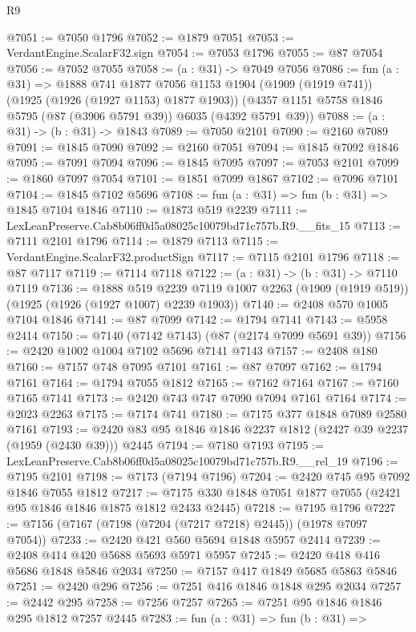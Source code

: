\begin{lexlean}{R9}
\begin{coremodule}
@7051 := @7050 @1796
@7052 := @1879 @7051
@7053 := VerdantEngine.ScalarF32.sign
@7054 := @7053 @1796
@7055 := @87 @7054
@7056 := @7052 @7055
@7058 := (a : @31) -> @7049 @7056
@7086 := fun (a : @31) =>
  @1888
    @741
    @1877
    @7056
    @1153
    @1904
    (@1909 (@1919 @741))
    (@1925 (@1926 (@1927 @1153) @1877 @1903))
    (@4357 @1151 @5758 @1846 @5795 (@87 (@3906 @5791 @39)) @6035 (@4392 @5791 @39))
@7088 := (a : @31) -> (b : @31) -> @1843
@7089 := @7050 @2101
@7090 := @2160 @7089
@7091 := @1845 @7090
@7092 := @2160 @7051
@7094 := @1845 @7092 @1846
@7095 := @7091 @7094
@7096 := @1845 @7095
@7097 := @7053 @2101
@7099 := @1860 @7097 @7054
@7101 := @1851 @7099 @1867
@7102 := @7096 @7101
@7104 := @1845 @7102 @5696
@7108 := fun (a : @31) => fun (b : @31) => @1845 @7104 @1846
@7110 := @1873 @519 @2239
@7111 := LexLeanPreserve.Cab8b06ff0d5a08025c10079bd71c757b.R9.__fits_15
@7113 := @7111 @2101 @1796
@7114 := @1879 @7113
@7115 := VerdantEngine.ScalarF32.productSign
@7117 := @7115 @2101 @1796
@7118 := @87 @7117
@7119 := @7114 @7118
@7122 := (a : @31) -> (b : @31) -> @7110 @7119
@7136 := @1888
    @519
    @2239
    @7119
    @1007
    @2263
    (@1909 (@1919 @519))
    (@1925 (@1926 (@1927 @1007) @2239 @1903))
@7140 := @2408 @570 @1005 @7104 @1846
@7141 := @87 @7099
@7142 := @1794 @7141
@7143 := @5958 @2414
@7150 := @7140 (@7142 @7143) (@87 (@2174 @7099 @5691 @39))
@7156 := @2420 @1002 @1004 @7102 @5696 @7141 @7143
@7157 := @2408 @180
@7160 := @7157 @748 @7095 @7101
@7161 := @87 @7097
@7162 := @1794 @7161
@7164 := @1794 @7055 @1812
@7165 := @7162 @7164
@7167 := @7160 @7165 @7141
@7173 := @2420 @743 @747 @7090 @7094 @7161 @7164
@7174 := @2023 @2263
@7175 := @7174 @741
@7180 := @7175 @377 @1848 @7089 @2580 @7161
@7193 := @2420 @83 @95 @1846 @1846 @2237 @1812 (@2427 @39 @2237 (@1959 (@2430 @39))) @2445
@7194 := @7180 @7193
@7195 := LexLeanPreserve.Cab8b06ff0d5a08025c10079bd71c757b.R9.__rel_19
@7196 := @7195 @2101
@7198 := @7173 (@7194 @7196)
@7204 := @2420 @745 @95 @7092 @1846 @7055 @1812
@7217 := @7175 @330 @1848 @7051 @1877 @7055 (@2421 @95 @1846 @1846 @1875 @1812 @2433 @2445)
@7218 := @7195 @1796
@7227 := @7156 (@7167 (@7198 (@7204 (@7217 @7218) @2445)) (@1978 @7097 @7054))
@7233 := @2420 @421 @560 @5694 @1848 @5957 @2414
@7239 := @2408 @414 @420 @5688 @5693 @5971 @5957
@7245 := @2420 @418 @416 @5686 @1848 @5846 @2034
@7250 := @7157 @417 @1849 @5685 @5863 @5846
@7251 := @2420 @296
@7256 := @7251 @416 @1846 @1848 @295 @2034
@7257 := @2442 @295
@7258 := @7256 @7257
@7265 := @7251 @95 @1846 @1846 @295 @1812 @7257 @2445
@7283 := fun (a : @31) =>
  fun (b : @31) =>

\end{coremodule}
\end{lexlean}
